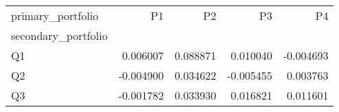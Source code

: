 \begin{tabular}{lrrrr}
\toprule
primary_portfolio & P1 & P2 & P3 & P4 \\
secondary_portfolio &  &  &  &  \\
\midrule
Q1 & 0.006007 & 0.088871 & 0.010040 & -0.004693 \\
Q2 & -0.004900 & 0.034622 & -0.005455 & 0.003763 \\
Q3 & -0.001782 & 0.033930 & 0.016821 & 0.011601 \\
\bottomrule
\end{tabular}
